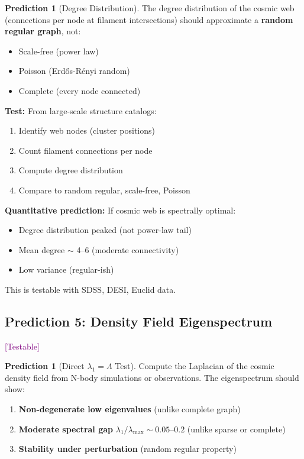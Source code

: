 \documentclass[11pt,a4paper]{article}
\theoremstyle{plain}
\theoremstyle{definition}
\newtheorem{prediction}[theorem]{Prediction}
\theoremstyle{remark}
\newcommand{\testable}{\textcolor{purple}{[Testable]}}
\begin{document}
\begin{prediction}[Degree Distribution]
The degree distribution of the cosmic web (connections per node at filament intersections) should approximate a \textbf{random regular graph}, not:
\begin{itemize}[noitemsep]
    \item Scale-free (power law)
    \item Poisson (Erd\H{o}s-R\'{e}nyi random)
    \item Complete (every node connected)
\end{itemize}
\end{prediction}

\textbf{Test:} From large-scale structure catalogs:
\begin{enumerate}[noitemsep]
    \item Identify web nodes (cluster positions)
    \item Count filament connections per node
    \item Compute degree distribution
    \item Compare to random regular, scale-free, Poisson
\end{enumerate}

\textbf{Quantitative prediction:} If cosmic web is spectrally optimal:
\begin{itemize}[noitemsep]
    \item Degree distribution peaked (not power-law tail)
    \item Mean degree $\sim$ 4--6 (moderate connectivity)
    \item Low variance (regular-ish)
\end{itemize}

This is testable with SDSS, DESI, Euclid data.

\subsection{Prediction 5: Density Field Eigenspectrum} \testable

\begin{prediction}[Direct $\lambda_1 = \Lambda$ Test]
Compute the Laplacian of the cosmic density field from N-body simulations or observations. The eigenspectrum should show:
\begin{enumerate}[noitemsep]
    \item \textbf{Non-degenerate low eigenvalues} (unlike complete graph)
    \item \textbf{Moderate spectral gap} $\lambda_1/\lambda_{\max} \sim 0.05$--$0.2$ (unlike sparse or complete)
    \item \textbf{Stability under perturbation} (random regular property)
\end{enumerate}
\end{prediction}
\end{document}
